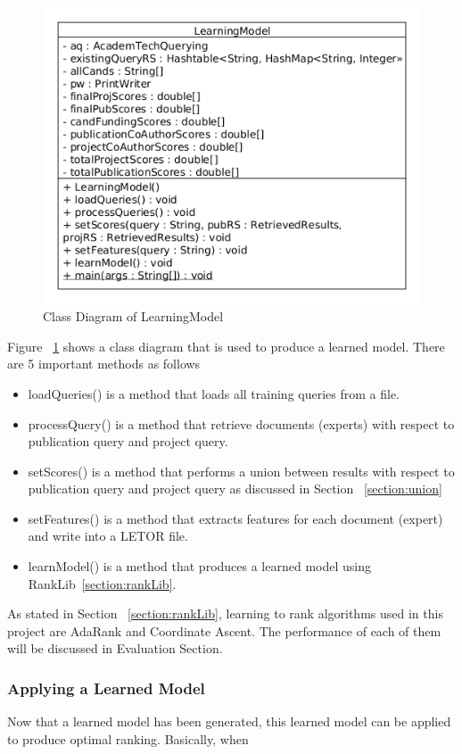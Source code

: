 \begin{figure}
\centering
\includegraphics[scale=0.7]{./figures/learningModel.png}
\caption{Class Diagram of LearningModel} \label{fig:learningmodel} 
\end{figure}

Figure ~\ref{fig:learningmodel} shows a class diagram that is used to produce a learned model. There are 5 important methods as follows
\begin{itemize}
 \item loadQueries() is a method that loads all training queries from a file.
 \item processQuery() is a method that retrieve documents (experts) with respect to publication query and project query.
 \item setScores() is a method that performs a union between results with respect to publication query and project query as discussed in Section ~\ref{section:union}
 \item setFeatures() is a method that extracts features for each document (expert) and write into a LETOR file.
 \item learnModel() is a method that produces a learned model using RankLib~\ref{section:rankLib}.
\end{itemize}

As stated in Section ~\ref{section:rankLib}, learning to rank algorithms used in this project are AdaRank and Coordinate Ascent. The performance of each
of them will be discussed in Evaluation Section.

\subsubsection{Applying a Learned Model}
Now that a learned model has been generated, this learned model can be applied to produce optimal ranking. Basically, when 







